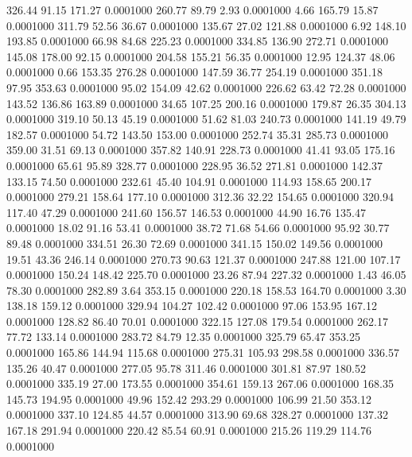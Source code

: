  326.44   91.15  171.27   0.0001000
 260.77   89.79    2.93   0.0001000
   4.66  165.79   15.87   0.0001000
 311.79   52.56   36.67   0.0001000
 135.67   27.02  121.88   0.0001000
   6.92  148.10  193.85   0.0001000
  66.98   84.68  225.23   0.0001000
 334.85  136.90  272.71   0.0001000
 145.08  178.00   92.15   0.0001000
 204.58  155.21   56.35   0.0001000
  12.95  124.37   48.06   0.0001000
   0.66  153.35  276.28   0.0001000
 147.59   36.77  254.19   0.0001000
 351.18   97.95  353.63   0.0001000
  95.02  154.09   42.62   0.0001000
 226.62   63.42   72.28   0.0001000
 143.52  136.86  163.89   0.0001000
  34.65  107.25  200.16   0.0001000
 179.87   26.35  304.13   0.0001000
 319.10   50.13   45.19   0.0001000
  51.62   81.03  240.73   0.0001000
 141.19   49.79  182.57   0.0001000
  54.72  143.50  153.00   0.0001000
 252.74   35.31  285.73   0.0001000
 359.00   31.51   69.13   0.0001000
 357.82  140.91  228.73   0.0001000
  41.41   93.05  175.16   0.0001000
  65.61   95.89  328.77   0.0001000
 228.95   36.52  271.81   0.0001000
 142.37  133.15   74.50   0.0001000
 232.61   45.40  104.91   0.0001000
 114.93  158.65  200.17   0.0001000
 279.21  158.64  177.10   0.0001000
 312.36   32.22  154.65   0.0001000
 320.94  117.40   47.29   0.0001000
 241.60  156.57  146.53   0.0001000
  44.90   16.76  135.47   0.0001000
  18.02   91.16   53.41   0.0001000
  38.72   71.68   54.66   0.0001000
  95.92   30.77   89.48   0.0001000
 334.51   26.30   72.69   0.0001000
 341.15  150.02  149.56   0.0001000
  19.51   43.36  246.14   0.0001000
 270.73   90.63  121.37   0.0001000
 247.88  121.00  107.17   0.0001000
 150.24  148.42  225.70   0.0001000
  23.26   87.94  227.32   0.0001000
   1.43   46.05   78.30   0.0001000
 282.89    3.64  353.15   0.0001000
 220.18  158.53  164.70   0.0001000
   3.30  138.18  159.12   0.0001000
 329.94  104.27  102.42   0.0001000
  97.06  153.95  167.12   0.0001000
 128.82   86.40   70.01   0.0001000
 322.15  127.08  179.54   0.0001000
 262.17   77.72  133.14   0.0001000
 283.72   84.79   12.35   0.0001000
 325.79   65.47  353.25   0.0001000
 165.86  144.94  115.68   0.0001000
 275.31  105.93  298.58   0.0001000
 336.57  135.26   40.47   0.0001000
 277.05   95.78  311.46   0.0001000
 301.81   87.97  180.52   0.0001000
 335.19   27.00  173.55   0.0001000
 354.61  159.13  267.06   0.0001000
 168.35  145.73  194.95   0.0001000
  49.96  152.42  293.29   0.0001000
 106.99   21.50  353.12   0.0001000
 337.10  124.85   44.57   0.0001000
 313.90   69.68  328.27   0.0001000
 137.32  167.18  291.94   0.0001000
 220.42   85.54   60.91   0.0001000
 215.26  119.29  114.76   0.0001000
